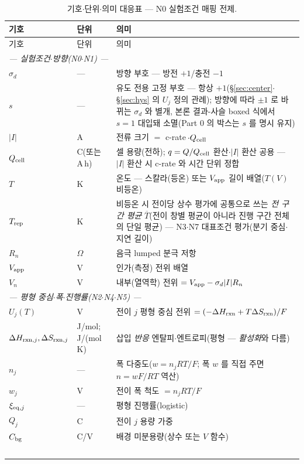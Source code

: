 \begin{longtable}{p{} p{} p{}}
\caption{기호$\cdot$단위$\cdot$의미 대응표 --- N0 실험조건 매핑 전제.}\label{tab:notation}\\
\toprule 기호 & 단위 & 의미 \\ \midrule \endfirsthead
\toprule 기호 & 단위 & 의미 \\ \midrule \endhead
\multicolumn{3}{l}{\emph{— 실험조건$\cdot$방향(N0$\cdot$N1) —}}\\
$\sigma_d$ & --- & 방향 부호 — 방전 $+1$/충전 $-1$ \\
$s$ & --- & 유도 전용 고정 부호 — 항상 $+1$(\S\ref{sec:center}$\cdot$\S\ref{sec:hys} 의 $U_j$ 정의 관례); 방향에 따라 $\pm1$ 로 바뀌는 $\sigma_d$ 와 별개, 본론 결과-사슬 boxed 식에서 $s{=}1$ 대입돼 소멸(Part 0 의 박스는 $s$ 를 명시 유지) \\
$|I|$ & A & 전류 크기 $=$ c-rate$\,\cdot Q_\cell$ \\
$Q_\cell$ & C(또는 A\,h) & 셀 용량(전하); $q=Q/Q_\cell$ 환산$\cdot$$|I|$ 환산 공용 — $|I|$ 환산 시 c-rate 와 시간 단위 정합 \\
$T$ & K & 온도 — 스칼라(등온) 또는 $V_\app$ 길이 배열($T(V)$ 비등온) \\
$T_\rep$ & K & 비등온 시 전이당 상수 평가에 공통으로 쓰는 \emph{전 구간 평균} $\overline T$(전이 창별 평균이 아니라 진행 구간 전체의 단일 평균) — N3$\cdot$N7 대표조건 평가(분기 중심$\cdot$지연 길이) \\
$R_n$ & $\Omega$ & 음극 lumped 분극 저항 \\
$V_\app$ & V & 인가(측정) 전위 배열 \\
$V_n$ & V & 내부(열역학) 전위 $=V_\app-\sigma_d|I|R_n$ \\
\multicolumn{3}{l}{\emph{— 평형 중심$\cdot$폭$\cdot$진행률(N2$\cdot$N4$\cdot$N5) —}}\\
$U_j(T)$ & V & 전이 $j$ 평형 중심 전위 $=(-\Delta H_\rxn+T\Delta S_\rxn)/F$ \\
$\Delta H_{\rxn,j},\Delta S_{\rxn,j}$ & {\footnotesize J/mol;\,J/(mol\,K)} & 삽입 \emph{반응} 엔탈피$\cdot$엔트로피(평형 — \emph{활성화}와 다름) \\
$n_j$ & --- & 폭 다중도($w=n_jRT/F$; 폭 $w$ 를 직접 주면 $n=wF/RT$ 역산) \\
$w_j$ & V & 전이 폭 척도 $=n_jRT/F$ \\
$\xi_{\eq,j}$ & --- & 평형 진행률(logistic) \\
$Q_j$ & C & 전이 $j$ 용량 가중 \\
$C_\bg$ & C/V & 배경 미분용량(상수 또는 $V$ 함수) \\
$$
\end{longtable}
